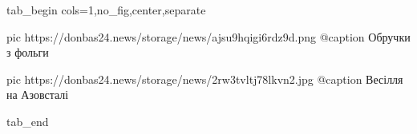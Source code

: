  
 
 
 
 

\ifcmt
  tab_begin cols=1,no_fig,center,separate

     pic https://donbas24.news/storage/news/ajsu9hqigi6rdz9d.png
		 @caption Обручки з фольги

     pic https://donbas24.news/storage/news/2rw3tvltj78lkvn2.jpg
		 @caption Весілля на Азовсталі

  tab_end
\fi
